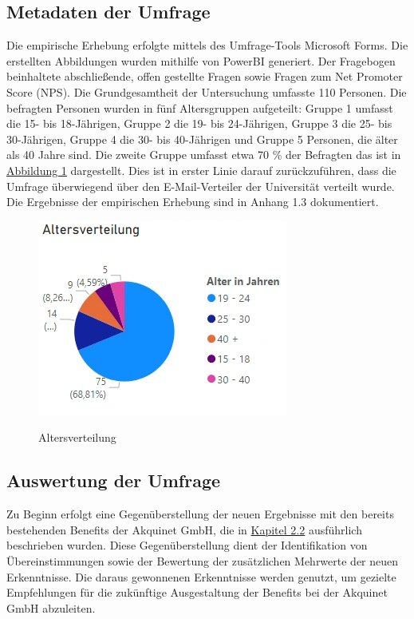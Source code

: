\subsection{Metadaten der Umfrage}
Die empirische Erhebung erfolgte mittels des Umfrage-Tools Microsoft Forms. Die erstellten Abbildungen wurden mithilfe von PowerBI generiert. Der Fragebogen beinhaltete abschließende, offen gestellte Fragen sowie Fragen zum Net Promoter Score (NPS). Die Grundgesamtheit der Untersuchung umfasste 110 Personen.\newline 
Die befragten Personen wurden in fünf Altersgruppen aufgeteilt: Gruppe 1 umfasst die 15- bis 18-Jährigen, Gruppe 2 die 19- bis 24-Jährigen, Gruppe 3 die 25- bis 30-Jährigen, Gruppe 4 die 30- bis 40-Jährigen und Gruppe 5 Personen, die älter als 40 Jahre sind. Die zweite Gruppe umfasst etwa 70 \% der Befragten das ist in \hyperref[abb:alter]{Abbildung 1} dargestellt. Dies ist in erster Linie darauf zurückzuführen, dass die Umfrage überwiegend über den E-Mail-Verteiler der Universität verteilt wurde.\newline
Die Ergebnisse der empirischen Erhebung sind in Anhang 1.3 dokumentiert.

\begin{figure}[H]
    \centering
    \includegraphics[scale = 0.7]{fig/Altersverteilung.png}
    \label{abb:alter}
    \caption{Altersverteilung}
\end{figure}

\subsection{Auswertung der Umfrage} \label{sec:auswertung}
Zu Beginn erfolgt eine Gegenüberstellung der neuen Ergebnisse mit den bereits bestehenden Benefits der Akquinet GmbH, die in \hyperref[sec:benefits]{Kapitel 2.2} ausführlich beschrieben wurden. Diese Gegenüberstellung dient der Identifikation von Übereinstimmungen sowie der Bewertung der zusätzlichen Mehrwerte der neuen Erkenntnisse. Die daraus gewonnenen Erkenntnisse werden genutzt, um gezielte Empfehlungen für die zukünftige Ausgestaltung der Benefits bei der Akquinet GmbH abzuleiten.

